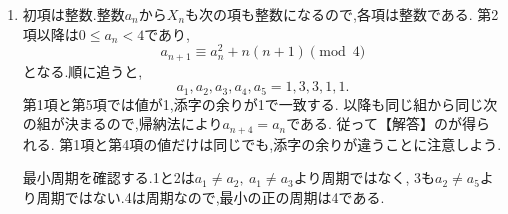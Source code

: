     \noindent {}\par\nobreak
    \begin{enumerate}[label=(\arabic*),parsep=3pt,beginpenalty=10000,format=\bookitemlink{example-gauss-role-3}{solution}{problem}]
      \item 初項は整数.整数$a_n$から$X_n$も次の項も整数になるので,各項は整数である.
            第2項以降は$0\le a_n<4$であり,
            \[
              a_{n+1}\equiv a_n^2+n(n+1)\pmod4
            \]
            となる.順に追うと,
            \[
              a_1,a_2,a_3,a_4,a_5=1,3,3,1,1.
            \]
            第1項と第5項では値が1,添字の余りが1で一致する.
            以降も同じ組から同じ次の組が決まるので,帰納法により$a_{n+4}=a_n$である.
            従って【解答】のが得られる.
            第1項と第4項の値だけは同じでも,添字の余りが違うことに注意しよう.

            最小周期を確認する.1と2は$a_1\ne a_2,\ a_1\ne a_3$より周期ではなく,
            3も$a_2\ne a_5$より周期ではない.4は周期なので,最小の正の周期は4である.
    \end{enumerate}
